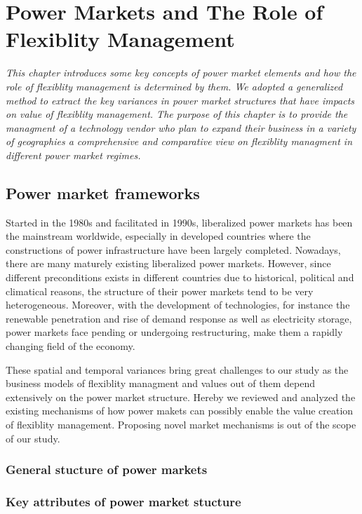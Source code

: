 \chapter{Power Markets and The Role of Flexiblity Management}
\label{ch:market}
\textit{This chapter introduces some key concepts of power market elements and how the role of flexiblity management is determined by them. We adopted a generalized method to extract the key variances in power market structures that have impacts on value of flexiblity management. The purpose of this chapter is to provide the managment of a technology vendor who plan to expand their business in a variety of geographies a comprehensive and comparative view on flexiblity managment in different power market regimes.}

\section{Power market frameworks}
Started in the 1980s and facilitated in 1990s, liberalized power markets has been the mainstream worldwide, especially in developed countries where the constructions of power infrastructure have been largely completed. \cite{Srivastava2011} %
Nowadays, there are many maturely existing liberalized power markets. However, since different preconditions exists in different countries due to historical, political and climatical reasons, the structure of their power markets tend to be very heterogeneous. Moreover, with the development of technologies, for instance the renewable penetration and rise of demand response as well as electricity storage, power markets face pending or undergoing restructuring, make them a rapidly changing field of the economy. \cite{Ziel2015}

These spatial and temporal variances bring great challenges to our study as the business models of flexiblity managment and values out of them depend extensively on the power market structure. Hereby we reviewed and analyzed the existing mechanisms of how power makets can possibly enable the value creation of flexiblity management. Proposing novel market mechanisms is out of the scope of our study. 

\subsection{General stucture of power markets}


\subsection{Key attributes of power market stucture}

